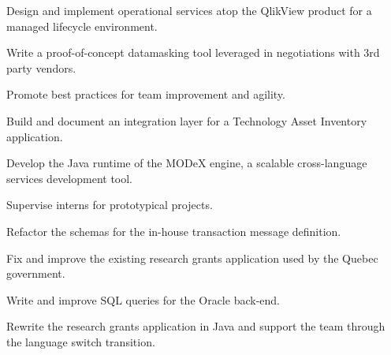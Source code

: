 \documentclass[letterpaper]{deedy-resume} %
\begin{document}
\begin{minipage}[t]{0.66\textwidth}

\begin{tightitemize}
\item Design and implement operational services atop the QlikView product for a managed lifecycle environment.
\item Write a proof-of-concept datamasking tool leveraged in negotiations with 3rd party vendors.
\item Promote best practices for team improvement and agility.
\item Build and document an integration layer for a Technology Asset Inventory application. 
\end{tightitemize}

\sectionspace %



\begin{tightitemize}
\item Develop the Java runtime of the MODeX engine, a scalable cross-language services development tool.
\item Supervise interns for prototypical projects.
\item Refactor the schemas for the in-house transaction message definition.
\end{tightitemize}

\sectionspace %



\begin{tightitemize}
\item Fix and improve the existing research grants application used by the Quebec government.
\item Write and improve SQL queries for the Oracle back-end.
\item Rewrite the research grants application in Java and support the team through the language switch transition.
\end{tightitemize}

\sectionspace %


\end{minipage}
\end{document}
